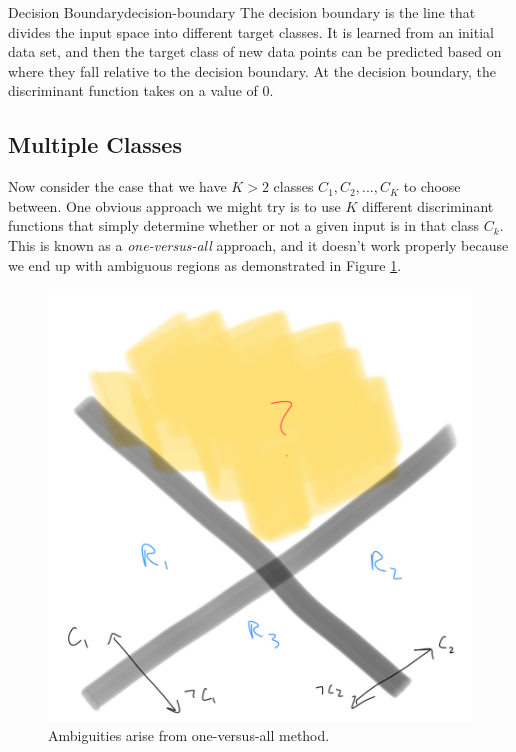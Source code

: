 \begin{definition}{Decision Boundary}{decision-boundary}
	The decision boundary is the line that divides the input space into different target classes. It is learned from an initial data set, and then the target class of new data points can be predicted based on where they fall relative to the decision boundary. At the decision boundary, the discriminant function takes on a value of 0.
\end{definition}


\subsection{Multiple Classes}
Now consider the case that we have $K > 2$ classes $C_{1}, C_{2}, ..., C_{K}$ to choose between. One obvious approach we might try is to use $K$ different discriminant functions that simply determine whether or not a given input is in that class $C_{k}$. This is known as a \textit{one-versus-all} approach, and it doesn't work properly because we end up with ambiguous regions as demonstrated in Figure \ref{fig:one-vs-all-ambig}.

\begin{figure}
    \centering
    \includegraphics[width=0.5\paperwidth]{../Classification/fig/one_vs_all_ambig_ipad.jpg}
    \caption{Ambiguities arise from one-versus-all method.}
    \label{fig:one-vs-all-ambig}
\end{figure}

